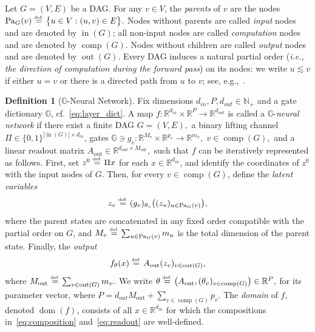 \documentclass{article}
\newcommand{\eqdef}{\ensuremath{\stackrel{\mbox{\upshape\tiny def.}}{=}}}
\theoremstyle{plain}
\theoremstyle{definition}
\newtheorem{definition}[theorem]{Definition}
\theoremstyle{remark}
\newcommand{\mSet}[1]{\big\{#1\big\}}
\theoremstyle{plain}
\numberwithin{thm}{section}
\theoremstyle{definition}
\numberwithin{equation}{section}
\begin{document}
Let $G = (V,E)$ be a DAG. For any $v\in V$, the \textit{parents} of $v$ are the nodes
$
    \operatorname{Pa}_G(v)
    \eqdef
        \mSet{u\in V:(u,v)\in E}
.
$
Nodes without parents are called \emph{input} nodes and are denoted by $\operatorname{in}(G)$; all non-input nodes are called \emph{computation} nodes and are denoted by $\operatorname{comp}(G)$.  Nodes without children are called \emph{output} nodes and are denoted by $\operatorname{out}(G)$.
Every DAG induces a natural partial order (\textit{i.e., the direction of computation during the forward pass}) on its nodes: we write $u\lesssim v$ if either $u=v$ or there is a directed path from $u$ to $v$; see, e.g.,~\citep[Proposition~2.1.3]{bang2008digraphs}.  

\begin{definition}[$\mathbb{G}$-Neural Network]
\label{defn:ANN}
Fix dimensions $d_{in},P,d_{out}\in \mathbb{N}_+$ and a gate dictionary $\mathbb{G}$, cf.~\eqref{eq:layer_dict}. 
A map
$
    f:\mathbb{R}^{d_{in}}\times \mathbb{R}^P\to \mathbb{R}^{d_{out}}
$
is called a $\mathbb{G}$-\emph{neural network} if there exist a finite DAG
$
    G=(V,E),
$
a binary lifting channel $\Pi\in \{0,1\}^{|\operatorname{in}(G)|\times d_{in}}$, gates
$
    \mathbb{G}\ni g_v:\mathbb{R}^{M_v}\times\mathbb{R}^{p_v}\to\mathbb{R}^{m_v},
$
$
v\in\operatorname{comp}(G),
$
and a linear readout matrix
$
    A_{\operatorname{out}}\in \mathbb{R}^{d_{out}\times M_{\operatorname{out}}},
$
such that $f$ can be iteratively represented as follows.
First, set
$
    z^0\eqdef \Pi x
$
for each $x\in\mathbb{R}^{d_{in}}$, and identify the coordinates of $z^0$ with the input nodes of $G$.  Then, for every $v\in\operatorname{comp}(G)$, define the \emph{latent variables}
\begin{equation}
\label{eq:composition}
    z_v
    \eqdef
        (g_v)_{\theta_v}
        \big(
            (z_u)_{u\in\operatorname{Pa}_G(v)}
        \big),
\end{equation}
where the parent states are concatenated in any fixed order compatible with the partial order on $G$, and
$
    M_v
    \eqdef
        \sum_{u\in\operatorname{Pa}_G(v)} m_u
$
is the total dimension of the parent state.  Finally, the \emph{output}
\begin{equation}
\label{eq:readout}
    f_{\theta}(x)
    \eqdef
        A_{\operatorname{out}}
        (z_v)_{v\in\operatorname{out}(G)},
\end{equation}
where
$
    M_{\operatorname{out}}
    \eqdef
        \sum_{v\in\operatorname{out}(G)} m_v .
$
We write
$
        \theta
    \eqdef
        \bigl(A_{\operatorname{out}},(\theta_v)_{v\in\operatorname{comp}(G)}\bigr)
        \in\mathbb{R}^P,
$
for its parameter vector, where
$
    P
    =
        d_{out}M_{\operatorname{out}}
        +
        \sum_{v\in\operatorname{comp}(G)} p_v .
$
The \emph{domain} of $f$, denoted $\operatorname{dom}(f)$, consists of all $x\in \mathbb{R}^{d_{in}}$ for which the compositions in~\eqref{eq:composition} and~\eqref{eq:readout} are well-defined.
\end{definition}
\end{document}
